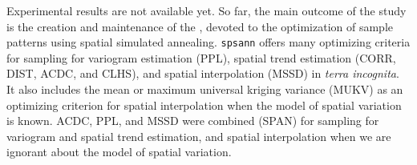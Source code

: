 Experimental results are not available yet. So far, the main outcome of the study is the creation and 
maintenance of the , devoted to the optimization of sample patterns using spatial simulated 
annealing. \texttt{spsann} offers many optimizing criteria for sampling for variogram estimation (PPL), 
spatial trend estimation (CORR, DIST, ACDC, and CLHS), and spatial interpolation (MSSD) in \emph{terra 
incognita}. It also  includes the mean or maximum universal kriging variance (MUKV) as an optimizing criterion 
for spatial interpolation when the model of spatial variation is known. ACDC, PPL, and MSSD were combined 
(SPAN) for sampling for variogram and spatial trend estimation, and spatial interpolation when we are ignorant 
about the model of spatial variation.
